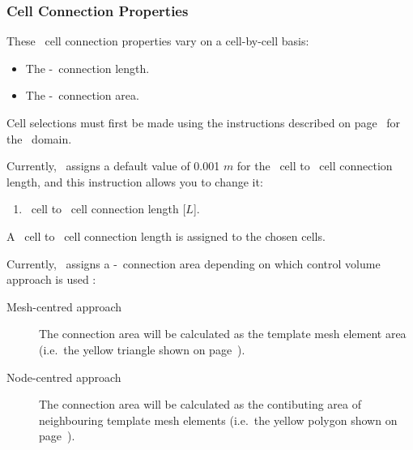 
\subsubsection{Cell Connection Properties}  


These \swf\ cell connection properties vary on a cell-by-cell basis:
\begin{itemize}
     \item The \swf-\gwf\ connection length.
     \item The \swf-\gwf\ connection area.
\end{itemize}

Cell selections must first be made using the instructions described on page~\pageref{page:cellSelect} for the \gwf\ domain.

Currently, \mut\ assigns a default value of 0.001 $m$ for the \swf\ cell to \gwf\ cell connection length, and this instruction allows you to change it:

    {
        \squish
        \begin{enumerate}
        \item {}  \swf\ cell to \gwf\ cell connection length [$L$].
        \end{enumerate}
          A \swf\ cell to \gwf\ cell connection length  is assigned to the chosen cells.
    }

Currently, \mut\ assigns a \swf-\gwf\ connection area depending on which control volume approach is used :
\begin{description}
\item [Mesh-centred approach] The connection area will be calculated as the template mesh element area (i.e.\ the yellow triangle shown on page~\pageref{page:MeshCentredApproach}).
\item [Node-centred approach] The connection area will be calculated as  the contibuting area of neighbouring template mesh elements (i.e.\ the yellow polygon shown on page~\pageref{page:NodeCentredApproach}).
\end{description}

